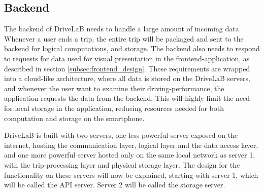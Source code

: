 \subsection{Backend}\label{subsec:backend_design}
The backend of DriveLaB needs to handle a large amount of incoming data. Whenever a user ends a trip, the entire trip will be packaged and sent to the backend for logical computations, and storage. The backend also needs to respond to requests for data used for visual presentation in the frontend-application, as described in section \ref{subsec:frontend_design}. These requirements are wrapped into a cloud-like architecture, where all data is stored on the DriveLaB servers, and whenever the user want to examine their driving-performance, the application requests the data from the backend. This will highly limit the need for local storage in the application, reducing resources needed for both computation and storage on the smartphone. 

DriveLaB is built with two servers, one less powerful server exposed on the internet, hosting the communication layer, logical layer and the data access layer, and one more powerful server hosted only on the same local network as server 1, with the trip-processing layer and physical storage layer. The design for the functionality on these servers will now be explained, starting with server 1, which will be called the API server. Server 2 will be called the storage server.